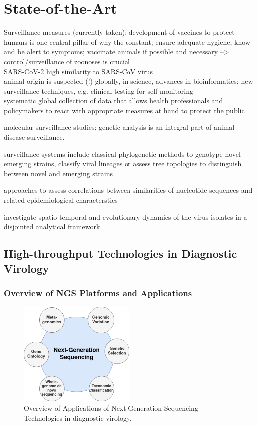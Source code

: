 \chapter{State-of-the-Art}\label{chap:state-art}

Surveillance measures (currently taken);
development of vaccines to protect humans is one central pillar of why the constant; ensure adequate hygiene, know and be alert to symptoms; vaccinate animals if possible and necessary --> control/surveillance of zoonoses is crucial \\

SARS-CoV-2 high similarity to SARS-CoV virus \\ animal origin is suspected (!)
	globally, in science, advances in bioinformatics: new surveillance techniques, e.g. clinical testing for self-monitoring \\
	systematic global collection of data that allows health professionals and policymakers to react with appropriate measures at hand to protect the public


molecular surveillance studies: genetic analysis is an integral part of animal disease surveillance.

surveillance systems include classical phylogenetic methods to genotype novel emerging strains, classify viral lineages or assess tree topologies to distinguish between novel and emerging strains

approaches to assess correlations between similarities of nucleotide sequences and related epidemiological characterstics

investigate spatio-temporal and evolutionary dynamics of the virus isolates in a disjointed analytical framework


\section{High-throughput Technologies in Diagnostic Virology}

\subsection{Overview of NGS Platforms and Applications}

\begin{figure}
	\centering
	\includegraphics[width=0.5\textwidth]{media/other/ngs.png}
	\caption{Overview of Applications of Next-Generation Sequencing Technologies in diagnostic virology.}
	\label{fig:ngs}
\end{figure}

